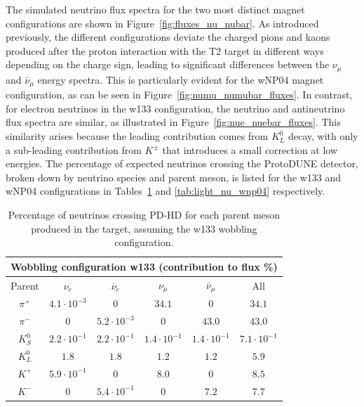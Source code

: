 The simulated neutrino flux spectra for the two most distinct magnet configurations are shown in Figure~\ref{fig:fluxes_nu_nubar}. As introduced previously, the different configurations deviate the charged pions and kaons produced after the proton interaction with the T2 target in different ways depending on the charge sign, leading to significant differences between the $\nu_{\mu}$ and $\bar{\nu}_{\mu}$ energy spectra. This is particularly evident for the wNP04 magnet configuration, as can be seen in Figure~\ref{fig:numu_numubar_fluxes}. In contrast, for electron neutrinos in the w133 configuration, the neutrino and antineutrino flux spectra are similar, as illustrated in Figure~\ref{fig:nue_nuebar_fluxes}. This similarity arises because the leading contribution comes from $K^0_L$ decay, with only a sub-leading contribution from $K^\pm$ that introduces a small correction at low energies. The percentage of expected neutrinos crossing the ProtoDUNE detector, broken down by neutrino species and parent meson, is listed for the w133 and wNP04 configurations in Tables~\ref{tab:light_nu_w133} and \ref{tab:light_nu_wnp04} respectively.

\begin{table}[h]
\centering
\begin{tabular}{|c|c|c|c|c|c|}
\hline
\multicolumn{6}{|c|}{Wobbling configuration w133 (contribution to flux \%)}\\
\hline
\hline
Parent & $\nu_e$ & $\overline{\nu}_e$ & $\nu_\mu$ & $\overline{\nu}_\mu$ & All \\
\hline
$\pi^+$ & $4.1 \cdot 10^{-3}$ & $0$ & $34.1$ & $0$ & $34.1$ \\ 
$\pi^-$ & $0$ & $5.2 \cdot 10^{-3}$ & $0$ & $43.0$ & $43.0$ \\ 
$K^0_S$ & $2.2 \cdot 10^{-1}$ & $2.2 \cdot 10^{-1}$ & $1.4 \cdot 10^{-1}$ & $1.4 \cdot 10^{-1}$ & $7.1 \cdot 10^{-1}$ \\ 
$K^0_L$ & $1.8$ & $1.8$ & $1.2$ & $1.2$ & $5.9$ \\ 
$K^+$ & $5.9 \cdot 10^{-1}$ & $0$ & $8.0$ & $0$ & $8.5$ \\ 
$K^-$ & $0$ & $5.4 \cdot 10^{-1}$ & $0$ & $7.2$ & $7.7$ \\ 
\hline
\end{tabular}
\caption{Percentage of neutrinos crossing PD-HD for each parent meson produced in the target, assuming the w133 wobbling configuration.}
\label{tab:light_nu_w133}
\end{table}

